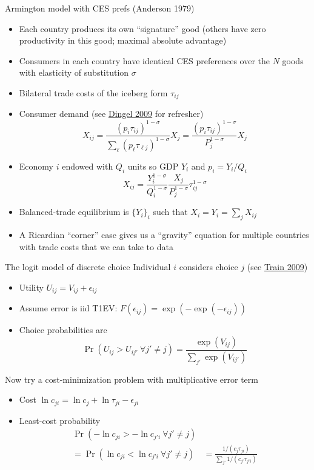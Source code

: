 \documentclass[10pt,notes=hide]{beamer}
\begin{document}
\begin{frame}{Armington model with CES prefs (Anderson 1979)}
\begin{itemize}
	\item Each country produces its own ``signature'' good (others have zero productivity in this good; maximal absolute advantage)
	\item Consumers in each country have identical CES preferences over the $N$ goods with elasticity of substitution $\sigma$
	\item Bilateral trade costs of the iceberg form $\tau_{ij}$
	\item Consumer demand (see \href{http://www.columbia.edu/~jid2106/td/dixitstiglitzbasics.pdf}{Dingel 2009} for refresher)
	\begin{equation*}
	X_{ij}	= \frac{(p_i\tau_{ij} )^{1-\sigma}}{\sum_{\ell} (p_\ell\tau_{\ell j})^{1-\sigma}} X_j
			= \frac{(p_i\tau_{ij} )^{1-\sigma}}{P_j^{1-\sigma}} X_j
	\end{equation*}
	\item Economy $i$ endowed with $Q_i$ units so GDP $Y_i$ and $p_i=Y_i/Q_i$
	\begin{equation*}
	X_{ij}	= \frac{Y_i^{1-\sigma}}{Q_i^{1-\sigma}} \frac{X_j}{P_j^{1-\sigma}}\tau_{ij}^{1-\sigma}
	\end{equation*}
	\item Balanced-trade equilibrium is $\{Y_i\}_{i}$ such that $X_i = Y_i = \sum_j X_{ij}$
	\item A Ricardian ``corner'' case gives us a ``gravity'' equation for multiple countries with trade costs that we can take to data
\end{itemize}
\end{frame}
\begin{frame}{The logit model of discrete choice}
Individual $i$ considers choice $j$ (see \href{https://eml.berkeley.edu/books/choice2.html}{Train 2009})
\begin{itemize}
	\item Utility $U_{ij} = V_{ij} + \epsilon_{ij}$
	\item Assume error is iid T1EV: $F\left(\epsilon_{ij}\right)=\exp(-\exp(-\epsilon_{ij}))$
	\item Choice probabilities are
	\begin{equation*}\Pr(U_{ij}>U_{ij'} \ \forall j' \neq j) = \frac{\exp(V_{ij})}{\sum_{j'}\exp(V_{ij'})} \end{equation*}
\end{itemize}
Now try a cost-minimization problem with multiplicative error term
\begin{itemize}
	\item Cost $\ln c_{ji} = \ln c_j + \ln \tau_{ji} - \epsilon_{ji}$
	\item Least-cost probability
	\begin{align*}
	\Pr(-\ln c_{ji}> -\ln c_{j'i} \ \forall j' \neq j) \\
	= \Pr(\ln c_{ji}<\ln c_{j'i} \ \forall j' \neq j) 
	& 
	= \frac{1/(c_j\tau_{ji})}{\sum_{j'}1/(c_{j'}\tau_{j'i})} \\
	\end{align*}
\end{itemize}
\end{frame}
\end{document}
